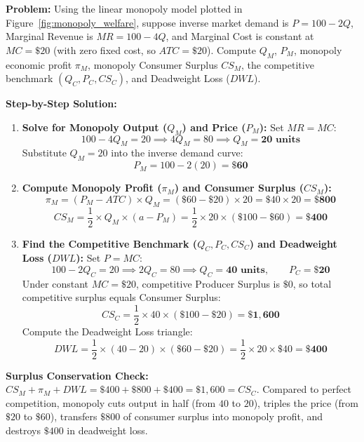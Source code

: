 \documentclass[11pt,letterpaper]{article}
\begin{document}
\begin{tcolorbox}[colback=CourseTeal!6!white,colframe=CourseTeal,title=\textbf{Work It Out: Monopoly Equilibrium, Profit, Surplus, and Deadweight Loss}]
\noindent\textbf{Problem:}
Using the linear monopoly model plotted in Figure~\ref{fig:monopoly_welfare}, suppose inverse market demand is $P = 100 - 2Q$, Marginal Revenue is $MR = 100 - 4Q$, and Marginal Cost is constant at $MC = \$20$ (with zero fixed cost, so $ATC = \$20$). Compute $Q_M$, $P_M$, monopoly economic profit $\pi_M$, monopoly Consumer Surplus $CS_M$, the competitive benchmark $(Q_C, P_C, CS_C)$, and Deadweight Loss ($DWL$).

\noindent\textbf{Step-by-Step Solution:}
\begin{enumerate}
    \item \textbf{Solve for Monopoly Output ($Q_M$) and Price ($P_M$):}
    Set $MR = MC$:
    \[
    100 - 4Q_M = 20 \implies 4Q_M = 80 \implies Q_M = \mathbf{20\text{ units}}
    \]
    Substitute $Q_M = 20$ into the inverse demand curve:
    \[
    P_M = 100 - 2(20) = \mathbf{\$60}
    \]

    \item \textbf{Compute Monopoly Profit ($\pi_M$) and Consumer Surplus ($CS_M$):}
    \[
    \pi_M = (P_M - ATC) \times Q_M = (\$60 - \$20) \times 20 = \$40 \times 20 = \mathbf{\$800}
    \]
    \[
    CS_M = \frac{1}{2} \times Q_M \times (a - P_M) = \frac{1}{2} \times 20 \times (\$100 - \$60) = \mathbf{\$400}
    \]

    \item \textbf{Find the Competitive Benchmark ($Q_C, P_C, CS_C$) and Deadweight Loss ($DWL$):}
    Set $P = MC$:
    \[
    100 - 2Q_C = 20 \implies 2Q_C = 80 \implies Q_C = \mathbf{40\text{ units}}, \qquad P_C = \mathbf{\$20}
    \]
    Under constant $MC = \$20$, competitive Producer Surplus is $\$0$, so total competitive surplus equals Consumer Surplus:
    \[
    CS_C = \frac{1}{2} \times 40 \times (\$100 - \$20) = \mathbf{\$1{,}600}
    \]
    Compute the Deadweight Loss triangle:
    \[
    DWL = \frac{1}{2} \times (40 - 20) \times (\$60 - \$20) = \frac{1}{2} \times 20 \times \$40 = \mathbf{\$400}
    \]
\end{enumerate}
\textbf{Surplus Conservation Check:} $CS_M + \pi_M + DWL = \$400 + \$800 + \$400 = \$1{,}600 = CS_C$. Compared to perfect competition, monopoly cuts output in half (from $40$ to $20$), triples the price (from $\$20$ to $\$60$), transfers $\$800$ of consumer surplus into monopoly profit, and destroys $\$400$ in deadweight loss.
\end{tcolorbox}
\end{document}
